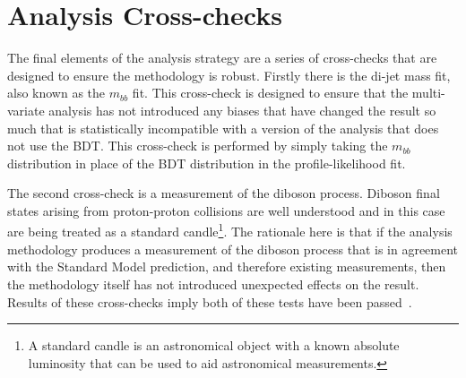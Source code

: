 \section{Analysis Cross-checks}

The final elements of the analysis strategy are a series of cross-checks that
are designed to ensure the methodology is robust. Firstly there is the di-jet
mass fit, also known as the $m_{bb}$ fit. This cross-check is designed to ensure
that the multi-variate analysis has not introduced any biases that have changed
the result so much that is statistically incompatible with a version of the
analysis that does not use the BDT. This cross-check is performed by simply
taking the $m_{bb}$ distribution in place of the BDT distribution in the
profile-likelihood fit.

The second cross-check is a measurement of the diboson process. Diboson final
states arising from proton-proton collisions are well understood and in this
case are being treated as a standard candle\footnote{A standard candle is an
astronomical object with a known absolute luminosity that can be used to aid
astronomical measurements. }. The rationale here is that if the analysis
methodology produces a measurement of the diboson process that is in agreement
with the Standard Model prediction, and therefore existing measurements, then
the methodology itself has not introduced unexpected effects on the result.
Results of these cross-checks imply both of these tests have been
passed~\cite{VHMainNote2019}.

